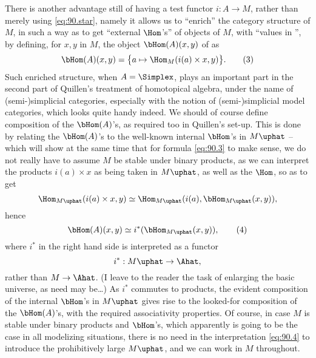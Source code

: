 There is another advantage still of having a test functor $i:A\to M$,
rather than merely using \eqref{eq:90.star}, namely it allows us to
``enrich'' the category structure of $M$, in such a way as to get
``external $\Hom$'s'' of objects of $M$, with ``values in \Ahat'', by
defining, for $x,y$ in $M$, the object $\bHom(A)(x,y)$ of \Ahat{} as
\begin{equation}
  \label{eq:90.3}
  \bHom(A)(x,y) = \bigl\{ a\mapsto\Hom_M(i(a)\times x,y)\bigr\}.
  \tag{3}
\end{equation}
Such enriched structure, when $A=\Simplex$, plays an important part in
the second part of Quillen's treatment of homotopical algebra, under
the name of (semi-)simplicial categories, especially with the notion
of (semi-)simplicial model categories, which looks quite handy
indeed. We should of course define composition of the
$\bHom(A)$'s, as required too in Quillen's set-up. This is done by
relating the $\bHom(A)$'s to the well-known internal $\bHom$'s in
$M\uphat$ -- which will show at the same time that for formula
\eqref{eq:90.3} to make sense, we do not really have to assume $M$ be
stable under binary products, as we can interpret the products
$i(a)\times x$ as being taken in $M\uphat$, as well as the $\Hom$, so
as to get
\[\Hom_{M\uphat}(i(a)\times x,y) \simeq \Hom_{M\uphat}(i(a),
\bHom_{M\uphat}(x,y)),\]
hence
\begin{equation}
  \label{eq:90.4}
  \bHom(A)(x,y)\simeq i^*(\bHom_{M\uphat}(x,y)),\tag{4}
\end{equation}
where $i^*$ in the right hand side is interpreted as a functor
\[ i^*:M\uphat\to\Ahat,\]
rather than $M\to\Ahat$. (I leave to the reader the task of enlarging
the basic universe, as need may be\ldots) As $i^*$ commutes to
products, the evident composition of the internal $\bHom$'s in
$M\uphat$ gives rise to the looked-for composition of the
$\bHom(A)$'s, with the required associativity properties. Of course,
in case $M$ is stable under binary products and $\bHom$'s, which
apparently is going to be the case in all modelizing situations, there
is no need in the interpretation \eqref{eq:90.4} to introduce the
prohibitively large $M\uphat$, and we can work in $M$ throughout.

